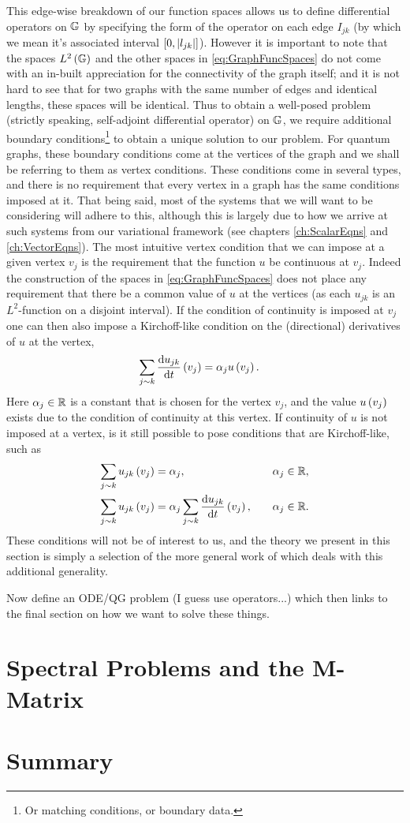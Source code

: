 This edge-wise breakdown of our function spaces allows us to define differential operators on $\mathbb{G}$ by specifying the form of the operator on each edge $I_{jk}$ (by which we mean it's associated interval $\left[ 0,\left\lvert l_{jk} \right\rvert \right]$).
However it is important to note that the spaces $L^2\left( \mathbb{G} \right)$ and the other spaces in \eqref{eq:GraphFuncSpaces} do not come with an in-built appreciation for the connectivity of the graph itself; and it is not hard to see that for two graphs with the same number of edges and identical lengths, these spaces will be identical.
Thus to obtain a well-posed problem (strictly speaking, self-adjoint differential operator) on $\mathbb{G}$, we require additional boundary conditions\footnote{Or matching conditions, or boundary data.} to obtain a unique solution to our problem.
For quantum graphs, these boundary conditions come at the vertices of the graph and we shall be referring to them as vertex conditions.
These conditions come in several types, and there is no requirement that every vertex in a graph has the same conditions imposed at it.
That being said, most of the systems that we will want to be considering will adhere to this, although this is largely due to how we arrive at such systems from our variational framework (see chapters \ref{ch:ScalarEqns} and \ref{ch:VectorEqns}).
The most intuitive vertex condition that we can impose at a given vertex $v_j$ is the requirement that the function $u$ be continuous at $v_j$.
Indeed the construction of the spaces in \eqref{eq:GraphFuncSpaces} does not place any requirement that there be a common value of $u$ at the vertices (as each $u_{jk}$ is an $L^2$-function on a disjoint interval).
If the condition of continuity is imposed at $v_j$ one can then also impose a Kirchoff-like condition on the (directional) derivatives of $u$ at the vertex,
\begin{align*}
	\sum_{j\sim k}\dfrac{\mathrm{d}u_{jk}}{\mathrm{d}t}\left( v_j \right) &= \alpha_j u\left( v_j \right).
\end{align*}
Here $\alpha_j\in\mathbb{R}$ is a constant that is chosen for the vertex $v_j$, and the value $u\left( v_j \right)$ exists due to the condition of continuity at this vertex.
If continuity of $u$ is not imposed at a vertex, is it still possible to pose conditions that are Kirchoff-like, such as
\begin{align*}
	\sum_{j\sim k}u_{jk}\left( v_j \right) &= \alpha_j, &\quad \alpha_j\in\mathbb{R}, \\
	\sum_{j\sim k}u_{jk}\left( v_j \right) &= \alpha_j \sum_{j\sim k}\dfrac{\mathrm{d}u_{jk}}{\mathrm{d}t}\left( v_j \right), &\quad \alpha_j\in\mathbb{R}.
\end{align*}
These conditions will not be of interest to us, and the theory we present in this section is simply a selection of the more general work of  which deals with this additional generality.

Now define an ODE/QG problem (I guess use operators...) which then links to the final section on how we want to solve these things.

\section{Spectral Problems and the M-Matrix}

\section{Summary}